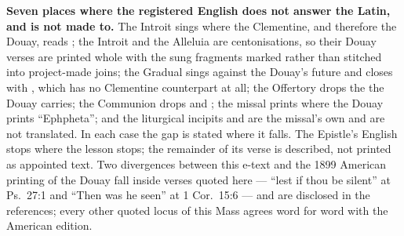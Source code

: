 \textbf{Seven places where the registered English does not answer the Latin,
and is not made to.} The Introit sings  where the Clementine,
and therefore the Douay, reads ; the Introit and the
Alleluia are centonisations, so their Douay verses are printed whole with the
sung fragments marked rather than stitched into project-made joins; the Gradual
sings  against the Douay's future and closes with
, which has no Clementine counterpart at all; the
Offertory drops the  the Douay carries; the Communion drops
 and ; the missal prints  where the
Douay prints ``Ephpheta''; and the liturgical incipits  and
 are the missal's own and are not
translated. In each case the gap is stated where it falls. The Epistle's
English stops where the lesson stops; the remainder of its verse is described,
not printed as appointed text. Two divergences between this e-text and the 1899
American printing of the Douay fall inside verses quoted here --- ``lest if thou
be silent'' at Ps.~27:1 and ``Then was he seen'' at 1 Cor.~15:6 --- and are
disclosed in the references; every other quoted locus of this Mass agrees word
for word with the American edition.


